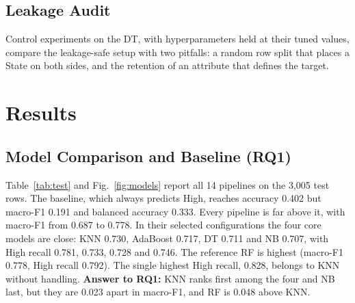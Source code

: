 \documentclass[conference]{IEEEtran}
\begin{document}
\subsection{Leakage Audit}
Control experiments on the DT, with hyperparameters held at their tuned values, compare the leakage-safe setup with two pitfalls: a random row split that places a State on both sides, and the retention of an attribute that defines the target.

\section{Results}
\label{sec:results}

\subsection{Model Comparison and Baseline (RQ1)}
Table~\ref{tab:test} and Fig.~\ref{fig:models} report all 14 pipelines on the 3,005 test rows. The baseline, which always predicts High, reaches accuracy 0.402 but macro-F1 0.191 and balanced accuracy 0.333. Every pipeline is far above it, with macro-F1 from 0.687 to 0.778. In their selected configurations the four core models are close: KNN 0.730, AdaBoost 0.717, DT 0.711 and NB 0.707, with High recall 0.781, 0.733, 0.728 and 0.746. The reference RF is highest (macro-F1 0.778, High recall 0.792). The single highest High recall, 0.828, belongs to KNN without handling. \textbf{Answer to RQ1:} KNN ranks first among the four and NB last, but they are 0.023 apart in macro-F1, and RF is 0.048 above KNN.
\end{document}
